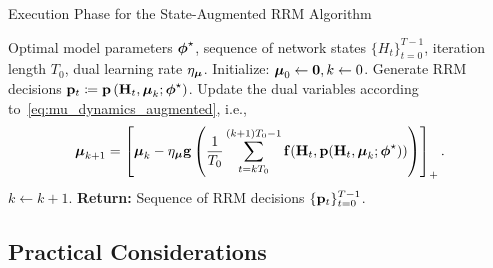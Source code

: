 \documentclass[lettersize,journal]{IEEEtran}
\newcommand{\nn}[1]{{\textcolor{red}{[\textit{Navid: #1}]}}}
\begin{document}
\begin{algorithm*}[t]
\caption{Execution Phase for the State-Augmented RRM Algorithm}
    \label{alg:execution}
    \begin{algorithmic}[1]
     Optimal model parameters $\boldsymbol{\phi}^{\star}$, sequence of network states $\{H_{t}\}_{t=0}^{T-1}$, iteration length $T_0$, dual learning rate $\eta_{\boldsymbol{\mu}}$.
    \STATE Initialize: $\boldsymbol{\mu}_0 \gets {\ensuremath{\mathbf 0}}, k \gets 0$.
        \STATE 
        Generate RRM decisions ${\mathbf p}_t \coloneqq {\ensuremath{\mathbf p}}\left({\mathbf H}_{t}, \boldsymbol{\mu}_k; \boldsymbol{\phi}^{\star}\right)$.
        \STATE
        Update the dual variables according to~\eqref{eq:mu_dynamics_augmented}, i.e., $$\boldsymbol{\mu}_{k+1} = \left[\boldsymbol{\mu}_k - \eta_{\boldsymbol{\mu}} {\mathbf g}\left( \frac{1}{T_0} \sum_{t=kT_0}^{(k+1)T_0-1} {\mathbf f}({\mathbf H}_{t}, {\mathbf p}({\mathbf H}_{t},\boldsymbol{\mu}_k;\boldsymbol{\phi}^{\star})) \right)\right]_+.$$
        \STATE
        $k \gets k+1.$
        \ENDIF
    \ENDFOR
    \STATE
    {\bfseries Return:} {Sequence of RRM decisions $\{{\mathbf p}_t\}_{t=0}^{T-1}$.}
    \end{algorithmic}
\end{algorithm*}


\subsection{Practical Considerations}%
\end{document}
